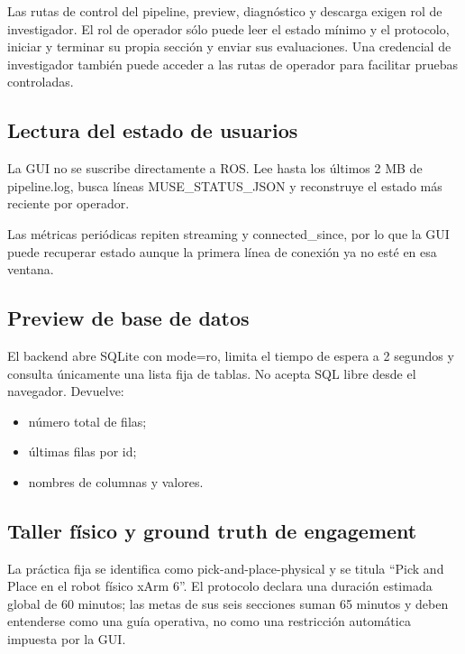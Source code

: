 \documentclass[11pt,a4paper]{article}
\begin{document}
Las rutas de control del pipeline, preview, diagnóstico y descarga exigen rol de
investigador. El rol de operador sólo puede leer el estado mínimo y el protocolo, iniciar
y terminar su propia sección y enviar sus evaluaciones. Una credencial de investigador también puede
acceder a las rutas de operador para facilitar pruebas controladas.

\subsection{Lectura del estado de usuarios}

La GUI no se suscribe directamente a ROS. Lee hasta los últimos 2 MB de {\ttfamily\small pipeline.log}, busca líneas {\ttfamily\small MUSE\_STATUS\_JSON} y reconstruye el estado más reciente por operador.

Las métricas periódicas repiten {\ttfamily\small streaming} y {\ttfamily\small connected\_since}, por lo que la GUI puede recuperar estado aunque la primera línea de conexión ya no esté en esa ventana.

\subsection{Preview de base de datos}

El backend abre SQLite con {\ttfamily\small mode=ro}, limita el tiempo de espera a 2 segundos y consulta únicamente una lista fija de tablas. No acepta SQL libre desde el navegador. Devuelve:

\begin{itemize}
\item número total de filas;
\item últimas filas por {\ttfamily\small id};
\item nombres de columnas y valores.
\end{itemize}

\subsection{Taller físico y ground truth de engagement}

La práctica fija se identifica como {\ttfamily\small pick-and-place-physical} y se titula
``Pick and Place en el robot físico xArm 6''. El protocolo declara una duración estimada
global de 60 minutos; las metas de sus seis secciones suman 65 minutos y deben entenderse como una
guía operativa, no como una restricción automática impuesta por la GUI.
\end{document}
